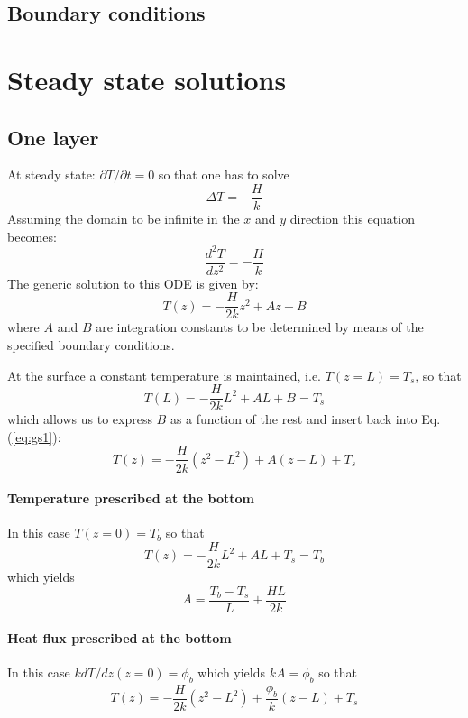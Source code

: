 \documentclass[a4paper]{article}
\begin{document}
\subsection{Boundary conditions}





\appendix
\newpage
\section{Steady state solutions}

\subsection{One layer}

At steady state: $\partial T/\partial t=0$ so that one has to solve 
\[
\Delta T = -\frac{H}{k}
\]
Assuming the domain to be infinite in the $x$ and $y$ direction this equation becomes:
\[
\frac{d^2T}{dz^2} = -\frac{H}{k}
\]
The generic solution to this ODE is given by:
\begin{equation}
T(z)=-\frac{H}{2k} z^2 + Az +B
\label{eq:gs1}
\end{equation}
where $A$ and $B$ are integration constants to be determined by means of the specified boundary conditions.

At the surface a constant temperature is maintained, i.e. $T(z=L)=T_s$, so that 
\[
T(L)=-\frac{H}{2k} L^2 + AL +B = T_s
\]
which allows us to express $B$ as a function of the rest and insert back into Eq. (\ref{eq:gs1}):
\[
T(z)=-\frac{H}{2k} (z^2-L^2) + A(z-L) + T_s
\]

\paragraph{Temperature prescribed at the bottom}

In this case $T(z=0)=T_b$ so that
\[
T(z)=-\frac{H}{2k} L^2 + AL + T_s=T_b
\]
which yields 
\[
A=\frac{T_b-T_s}{L} + \frac{HL}{2k}
\]
 

\paragraph{Heat flux prescribed at the bottom}

In this case $kdT/dz(z=0)=\phi_b$ which yields $kA=\phi_b$ so that
\[
T(z)=-\frac{H}{2k} (z^2-L^2) + \frac{\phi_b}{k}(z-L) + T_s
\]
\end{document}
